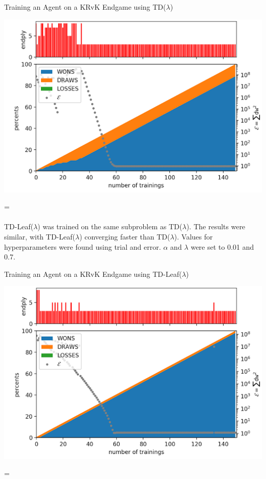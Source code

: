\documentclass[12pt,a4paper]{book}
\newenvironment{absolutelynopagebreak}
{\par\nobreak\vfil\penalty0\vfilneg
  \vtop\bgroup}
{\par\xdef\tpd{\the\prevdepth}\egroup
  \prevdepth=\tpd}
\begin{document}
\begin{absolutelynopagebreak}
\begin{center}
  \centerline{Training an Agent on a KRvK Endgame using TD($\lambda$)}
  \includegraphics[scale=0.7]{tdlambdaloss.png}
\end{center}
\end{absolutelynopagebreak}

\paragraph{} TD-Leaf($\lambda$) was trained on the same subproblem as TD($\lambda$). The results were similar, with TD-Leaf($\lambda$) converging faster than TD($\lambda$). Values for hyperparameters were found using trial and error. $\alpha$ and $\lambda$ were set to 0.01 and 0.7.

\begin{absolutelynopagebreak}
\begin{center}
  \centerline{Training an Agent on a KRvK Endgame using TD-Leaf($\lambda$)}
  \includegraphics[scale=0.7]{tdleafloss.png}
\end{center}
\end{absolutelynopagebreak}
\end{document}
